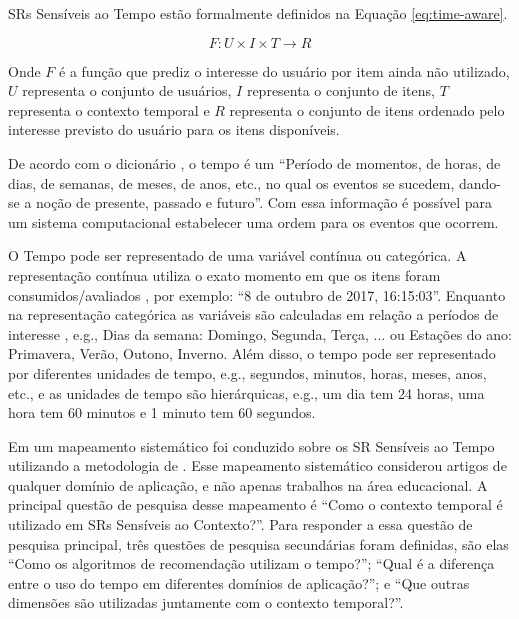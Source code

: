 SRs Sensíveis ao Tempo estão formalmente definidos na Equação \ref{eq:time-aware}.

\begin{equation}
  F: U \times I \times T \rightarrow R
  \label{eq:time-aware}
\end{equation}

Onde $F$ é a função que prediz o interesse do usuário por item ainda não utilizado, $U$ representa o conjunto de usuários,
$I$ representa o conjunto de itens, $T$ representa o contexto temporal e $R$ representa o conjunto de itens ordenado pelo
interesse previsto do usuário para os itens disponíveis.

De acordo com o dicionário , o tempo é um  ``Período de momentos, de horas, de dias,
de semanas, de meses, de anos, etc., no qual os eventos se sucedem, dando-se a noção de presente, passado e futuro''.
Com essa informação é possível para um sistema computacional estabelecer uma ordem para os eventos que ocorrem.

O Tempo pode ser representado de uma variável contínua ou categórica. A representação contínua utiliza o exato momento
em que os itens foram consumidos/avaliados \cite{campos2014time}, por exemplo: ``8 de outubro de 2017, 16:15:03''.
Enquanto na representação categórica as variáveis são calculadas em relação a períodos de interesse \cite{campos2014time},
e.g., Dias da semana: {Domingo, Segunda, Terça, ...} ou Estações do ano: {Primavera, Verão, Outono, Inverno}. Além
disso, o tempo pode ser representado por diferentes unidades de tempo, e.g., segundos, minutos, horas, meses, anos,
etc., e as unidades de tempo são hierárquicas, e.g., um dia tem 24 horas, uma hora tem 60 minutos e 1 minuto tem 60
segundos.

Em  um mapeamento sistemático foi conduzido sobre os SR Sensíveis ao Tempo utilizando a metodologia de
. Esse mapeamento sistemático considerou artigos de qualquer domínio de aplicação,
e não apenas trabalhos na área educacional. A principal questão de pesquisa desse mapeamento é ``Como o contexto
temporal é utilizado em SRs Sensíveis ao Contexto?''. Para responder a essa questão de pesquisa principal, três questões
de pesquisa secundárias foram definidas, são elas ``Como os algoritmos de recomendação utilizam o tempo?''; ``Qual é a
diferença entre o uso do tempo em diferentes domínios de aplicação?''; e ``Que outras dimensões são utilizadas
juntamente com o contexto temporal?''.

